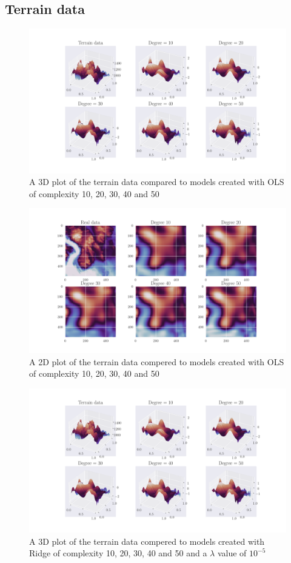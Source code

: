 \subsection{Terrain data}
\begin{figure}[H]
	\centering
	\includegraphics[width=\linewidth]{images/Figure_30.png}
	\caption{A 3D plot of the terrain data compared to models created with OLS of complexity 10, 20, 30, 40 and 50}
	\label{OLS 3D figure terrain data}
\end{figure}
%
\begin{figure}[H]
	\centering
	\includegraphics[width=\linewidth]{images/Figure_31.png}
	\caption{A 2D plot of the terrain data compered to models created with OLS of complexity 10, 20, 30, 40 and 50}
	\label{OLS 2D figure terrain data}
\end{figure}
%
\begin{figure}[H]
	\centering
	\includegraphics[width=\linewidth]{images/Figure_30.png}
	\caption{A 3D plot of the terrain data compered to models created with Ridge of complexity 10, 20, 30, 40 and 50 and a $\lambda$ value of $10^{-5}$}
	\label{Ridge 3D figure terrain data}
\end{figure}
